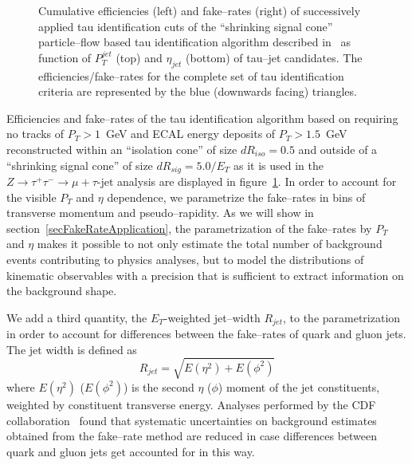 \begin{figure}[t]
\begin{center}
\begin{picture}
\end{picture}
\caption{\captiontext Cumulative efficiencies (left) and fake--rates (right) of successively applied tau identification cuts 
         of the ``shrinking signal cone'' particle--flow based tau identification algorithm described in~\cite{PFlowTauReco}
         as function of $P_{T}^{jet}$ (top) and $\eta_{jet}$ (bottom) of tau--jet candidates.
	 The efficiencies/fake--rates for the complete set of tau identification criteria 
         are represented by the blue (downwards facing) triangles.}
\label{figPFTauReco_EfficienciesAndFakeRates}
\end{center}
\end{figure} 

Efficiencies and fake--rates of the tau identification algorithm based 
on requiring no tracks of $P_{T} > 1$~GeV and ECAL energy deposits of $P_{T} > 1.5$~GeV
reconstructed within an ``isolation cone'' of size $dR_{iso} = 0.5$ 
and outside of a ``shrinking signal cone'' of size $dR_{sig} = 5.0 / E_{T}$ 
as it is used in the $Z \rightarrow \tau^{+} \tau^{-} \rightarrow \mu + \tau\mbox{-jet}$ analysis 
are displayed in figure~\ref{figPFTauReco_EfficienciesAndFakeRates}.
In order to account for the visible $P_{T}$ and $\eta$ dependence,
we parametrize the fake--rates in bins of transverse momentum and pseudo--rapidity.
As we will show in section~\ref{secFakeRateApplication},
the parametrization of the fake--rates by $P_{T}$ and $\eta$ makes it possible 
to not only estimate the total number of background events contributing to physics analyses,
but to model the distributions of kinematic observables with a precision
that is sufficient to extract information on the background shape.

We add a third quantity, the $E_{T}$-weighted jet--width $R_{jet}$, to the
parametrization in order to account for differences between the fake--rates of
quark and gluon jets.  The jet width is defined as 
\begin{equation}
R_{jet} = \sqrt{E \left( \eta^2 \right) + E \left( \phi^2 \right)}
\end{equation}
where $E \left( \eta^2 \right)$ ($E \left( \phi^2 \right)$) is the second $\eta$ ($\phi$) moment of the jet constituents, weighted by
constituent transverse energy. Analyses performed by the CDF
collaboration~\cite{CDFtypeFakeRateMethod} found that systematic uncertainties
on background estimates obtained from the fake--rate method are reduced in case
differences between quark and gluon jets get accounted for in this way.

